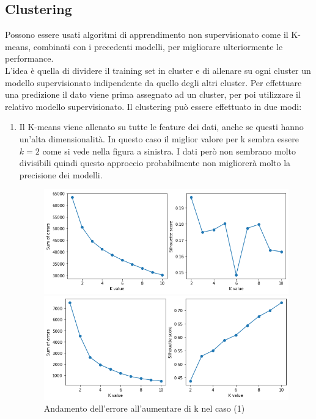 \documentclass{article}
\begin{document}
\subsection{Clustering}
\label{sec:clustering}
Possono essere usati algoritmi di apprendimento non supervisionato come il
K-means, combinati con i precedenti modelli, per migliorare ulteriormente le
performance.\\
L'idea è quella di dividere il training set in cluster e di allenare su ogni
cluster un modello supervisionato indipendente da quello degli altri cluster.
Per effettuare una predizione il dato viene prima assegnato ad un cluster, per
poi utilizzare il relativo modello supervisionato.
Il clustering può essere effettuato in due modi:
\begin{enumerate}
	\item Il K-means viene allenato su tutte le feature dei dati, anche se
		questi hanno un'alta dimensionalità. In questo caso il miglior valore
		per k sembra essere $k=2$ come si vede nella figura a sinistra.
		I dati però non sembrano molto divisibili quindi questo approccio
		probabilmente non migliorerà molto la precisione dei modelli.
		\begin{figure}[ht]
			\centering
			\begin{minipage}{0.48\textwidth}
				\centering
				\includegraphics[width=\textwidth]{kselection1.png}
				\caption{Andamento dell'errore all'aumentare di k nel caso (1)}
			\end{minipage}
			\hfill
			\begin{minipage}{0.48\textwidth}
				\centering
				\includegraphics[width=\textwidth]{kselection2.png}

\end{minipage}
\end{figure}
\end{enumerate}
\end{document}

